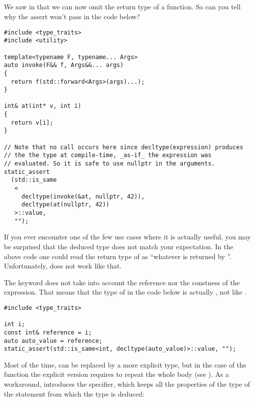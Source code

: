 \subsection{}

\problemtitle

We saw in  that we can now omit the
return type of a function. So can you tell why the assert won't pass
in the code below?

\begin{lstlisting}
#include <type_traits>
#include <utility>

template<typename F, typename... Args>
auto invoke(F&& f, Args&&... args)
{
  return f(std::forward<Args>(args)...);
}

int& at(int* v, int i)
{
  return v[i];
}

// Note that no call occurs here since decltype(expression) produces
// the the type at compile-time, _as-if_ the expression was
// evaluated. So it is safe to use nullptr in the arguments.
static_assert
  (std::is_same
   <
     decltype(invoke(&at, nullptr, 42)),
     decltype(at(nullptr, 42))
   >::value,
   "");
\end{lstlisting}

If you ever encounter one of the few use cases where  it is
actually useful, you may be surprised that the deduced type does not
match your expectation. In the above code one could read the return
type of  as ``whatever is returned by
''. Unfortunately,  does not work like that.

The  keyword does not take into account the reference nor
the constness of the expression. That means that the type of
 in the code below is actually , not
 like .

\begin{lstlisting}
#include <type_traits>

int i;
const int& reference = i;
auto auto_value = reference;
static_assert(std::is_same<int, decltype(auto_value)>::value, "");
\end{lstlisting}

\solutiontitle

Most of the time,  can be replaced by a more explicit type,
but in the case of the  function the explicit version
requires to repeat the whole body (see
). As a workaround,  introduces
the  specifier, which keeps all the properties of
the type of the statement from which the type is deduced:


